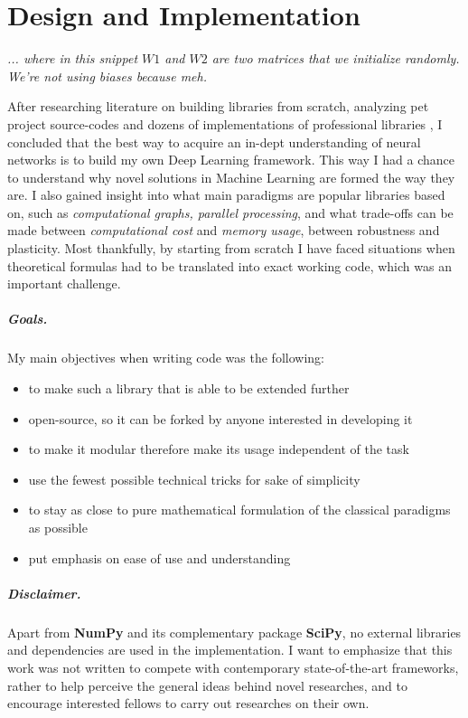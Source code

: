 \chapter{Design and Implementation}

\epigraph{\textit{... where in this snippet $W1$ and $W2$ are two matrices that we initialize randomly. We're not using biases because meh.}}{}

After researching literature on building libraries from scratch, analyzing pet project source-codes \cite{convnetjs, gibianskysource} and dozens of implementations of professional libraries \cite{TF, caffe, torch},
I concluded that the best way to acquire an in-dept understanding of neural networks is to build my own Deep Learning framework.
This way I had a chance to understand why novel solutions in Machine Learning are formed the way they are.
I also gained insight into what main paradigms are popular libraries based on, such as \emph{computational graphs, parallel processing}, 
and what trade-offs can be made between \emph{computational cost} and \emph{memory usage}, between robustness and plasticity.
Most thankfully, by starting from scratch I have faced situations when theoretical formulas had to be translated into exact working code, which was an important challenge.

\paragraph{Goals.} My main objectives when writing code was the following:
\begin{itemize}
    \item[] to make such a library that is able to be extended further
    \item[] open-source, so it can be forked by anyone interested in developing it
    \item[] to make it modular therefore make its usage independent of the task
    \item[] use the fewest possible technical tricks for sake of simplicity
    \item[] to stay as close to pure mathematical formulation of the classical paradigms as possible
    \item[] put emphasis on ease of use and understanding
\end{itemize}
\paragraph{Disclaimer.} Apart from \textbf{NumPy} and its complementary package \textbf{SciPy}, no external libraries and dependencies are used in the implementation. 
I want to emphasize that this work was not written to compete with contemporary state-of-the-art frameworks, rather to help perceive the general ideas behind novel researches, and to encourage interested fellows to carry out researches on their own.
\clearpage
